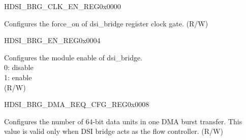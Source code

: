 \begin{register}{H}{DSI\_BRG\_CLK\_EN\_REG}{0x0000}\label{regdesc:DSIBRGCLKENREG}
%
%
\regnewline%
\begin{regdesc}\begin{reglist}
\label{fielddesc:DSIBRGCLKEN}\item [DSI\_BRG\_CLK\_EN] Configures the force\_on of dsi\_bridge register clock gate. (R/W)
\end{reglist}\end{regdesc}
\end{register}


\begin{register}{H}{DSI\_BRG\_EN\_REG}{0x0004}\label{regdesc:DSIBRGENREG}
%
%
\regnewline%
\begin{regdesc}\begin{reglist}
\label{fielddesc:DSIBRGDSIEN}\item [DSI\_BRG\_DSI\_EN] Configures the module enable of dsi\_bridge. \\0: disable\\1: enable \\(R/W)
\end{reglist}\end{regdesc}
\end{register}


\begin{register}{H}{DSI\_BRG\_DMA\_REQ\_CFG\_REG}{0x0008}\label{regdesc:DSIBRGDMAREQCFGREG}
%
%
\regnewline%
\begin{regdesc}\begin{reglist}
\label{fielddesc:DSIBRGDMABURSTLEN}\item [DSI\_BRG\_DMA\_BURST\_LEN] Configures the number of 64-bit data units in one DMA burst transfer. This value is valid only when DSI bridge acts as the flow controller. (R/W)
\end{reglist}\end{regdesc}
\end{register}


